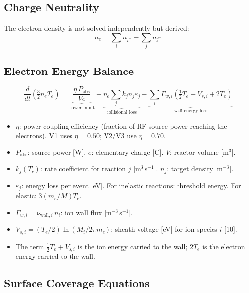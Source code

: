 \documentclass[11pt,a4paper]{article}
\begin{document}
\subsection{Charge Neutrality}

The electron density is not solved independently but derived:
\begin{equation}\label{eq:qn}
n_e = \sum_i n_{i^+} - \sum_j n_{j^-}
\end{equation}

\subsection{Electron Energy Balance}

\begin{equation}\label{eq:power}
\boxed{\frac{d}{dt}\!\left(\tfrac{3}{2}n_e T_e\right) = \underbrace{\frac{\eta\,P_\text{abs}}{Ve}}_\text{power input} - \underbrace{n_e\sum_j k_j n_j \varepsilon_j}_\text{collisional loss} - \underbrace{\sum_i \Gamma_{w,i}\!\left(\tfrac{1}{2}T_e + V_{s,i} + 2T_e\right)}_\text{wall energy loss}}
\end{equation}

\begin{itemize}[nosep]
\item $\eta$: power coupling efficiency (fraction of RF source power reaching the electrons). V1 uses $\eta = 0.50$; V2/V3 use $\eta = 0.70$.
\item $P_\text{abs}$: source power [W]. $e$: elementary charge [C]. $V$: reactor volume [m$^3$].
\item $k_j(T_e)$: rate coefficient for reaction $j$ [m$^3$\,s$^{-1}$]. $n_j$: target density [m$^{-3}$].
\item $\varepsilon_j$: energy loss per event [eV]. For inelastic reactions: threshold energy. For elastic: $3(m_e/M)T_e$.
\item $\Gamma_{w,i} = \nu_{\text{wall},i}\,n_i$: ion wall flux [m$^{-3}$\,s$^{-1}$].
\item $V_{s,i} = (T_e/2)\ln(M_i/2\pi m_e)$: sheath voltage [eV] for ion species $i$ [10].
\item The term $\frac{1}{2}T_e + V_{s,i}$ is the ion energy carried to the wall; $2T_e$ is the electron energy carried to the wall.
\end{itemize}

\subsection{Surface Coverage Equations}
\end{document}
